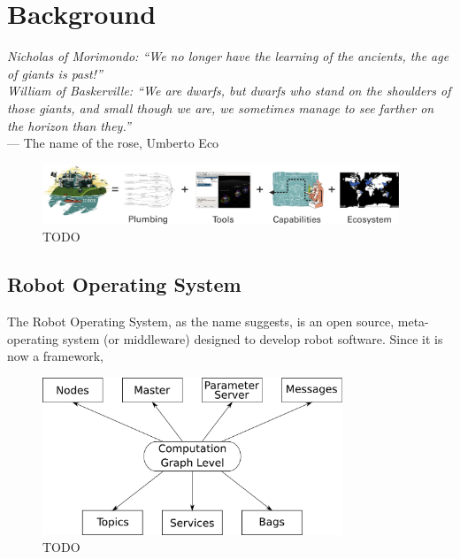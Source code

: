 \chapter[Background]{Background}\label{ch:AADL}

\begin{flushright}{\slshape Nicholas of Morimondo: ``We no longer have the learning of the ancients, the age of giants is past!'' \\
William of Baskerville: ``We are dwarfs, but dwarfs who stand on the shoulders of those giants, and small though we are, we sometimes manage to see farther on the horizon than they.''} \\ \medskip
    ---  The name of the rose, Umberto Eco
\end{flushright}

\lipsum[2-4]

\minitoc
\newpage

\begin{figure}[t]
    \centering
    \includegraphics[width=0.95\textwidth]{gfx/ros/ros_equation}
    \caption{TODO}\label{fig:ros}
\end{figure}

\section{Robot Operating System}
The Robot Operating System, as the name suggests, is an open source, meta-operating system (or middleware) designed to develop robot software. Since it is now a framework, 

\begin{figure}[t]
    \centering
    \includegraphics[width=0.8\textwidth]{gfx/ros/graph}
    \caption{TODO}\label{fig:ros-graph}
\end{figure}

